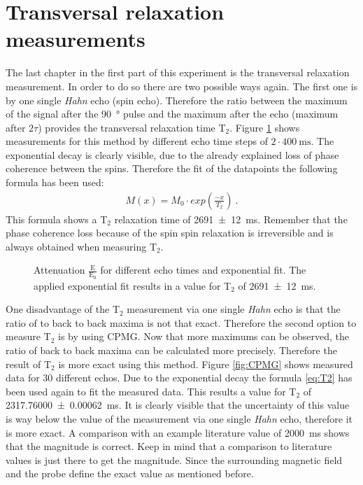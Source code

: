 \section{Transversal relaxation measurements}
\label{sec:Transversalrelaxationmeasurements}
The last chapter in the first part of this experiment is the transversal relaxation measurement. In order to do so there are two possible ways again.\newline
The first one is by one single \textit{Hahn} echo (spin echo). Therefore the ratio between the maximum of the signal after the \SI{90}{\degree} pulse and the maximum after the echo (maximum after $2\tau$) provides the transversal relaxation time T$_2$. Figure \ref{fig:T2} shows measurements for this method by different echo time steps of $2\cdot \SI{400}{\milli \second}$. The exponential decay is clearly visible, due to the already explained loss of phase coherence between the spins. Therefore the fit of the datapoints the following formula has been used:
\begin{align}
    M(x)=M_0 \cdot exp\left(\frac{-x}{T_{2}}\right) \ .
 \label{eq:T2}
\end{align}
This formula shows a T$_2$ relaxation time of \SI{2691 \pm 12}{\milli \second}. Remember that the phase coherence loss because of the spin spin relaxation is irreversible and is always obtained when measuring T$_2$.

\begin{figure}[H]
    \centering
    
    \caption[Attenuation $\frac{\text{E}}{\text{E}_0}$ for different echo times and exponential fit.]{Attenuation $\frac{\text{E}}{\text{E}_0}$ for different echo times and exponential fit. The applied exponential fit results in a value for T$_2$ of \SI{2691 \pm 12}{\milli \second}.}
    \label{fig:T2}
\end{figure}

One disadvantage of the T$_2$ measurement via one single \textit{Hahn} echo is that the ratio of to back to back maxima is not that exact. Therefore the second option to measure T$_2$ is by using CPMG. Now that more maximums can be observed, the ratio of back to back maxima can be calculated more precisely. Therefore the result of T$_2$ is more exact using this method. Figure \ref{fig:CPMG} shows measured data for 30 different echos. Due to the exponential decay the formula \ref{eq:T2} has been used again to fit the measured data. This results a value for T$_2$ of \SI{2317.76000 \pm 0.00062}{\milli \second}. It is clearly visible that the uncertainty of this value is way below the value of the measurement via one single \textit{Hahn} echo, therefore it is more exact. A comparison with an example literature value of \SI{2000}{\milli \second} \cite{literaturT1} shows that the magnitude is correct. Keep in mind that a comparison to literature values is just there to get the magnitude. Since the surrounding magnetic field and the probe define the exact value as mentioned before.

